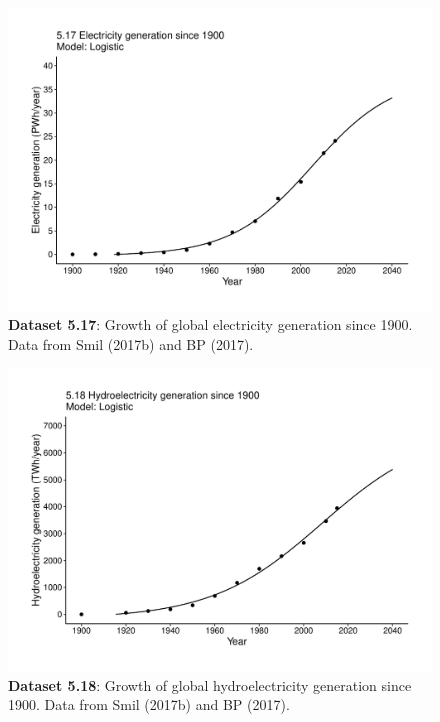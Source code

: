 \documentclass[aps,rmp,preprint,superscriptaddress,10pt,onecolumn]{article}
\begin{document}
\clearpage
\begin{figure}[h]
\includegraphics[width=\textwidth]{output/figs-ggplot/5.17.pdf}
\caption{\textbf{Dataset 5.17}: Growth of global electricity generation since 1900. Data from Smil (2017b) and BP (2017). }
\end{figure}
	
\clearpage
\begin{figure}[h]
\includegraphics[width=\textwidth]{output/figs-ggplot/5.18.pdf}
\caption{\textbf{Dataset 5.18}: Growth of global hydroelectricity generation since 1900. Data from Smil (2017b) and BP (2017).}
\end{figure}
	
\end{document}

